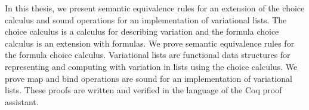 \bigskip
\bigskip
\noindent
In this thesis, we present semantic equivalence rules for an extension of the choice calculus and sound operations for an implementation of variational lists.
The choice calculus is a calculus for describing variation and the formula choice calculus is an extension with formulas.
We prove semantic equivalence rules for the formula choice calculus.
Variational lists are functional data structures for representing and computing with variation in lists using the choice calculus.
We prove map and bind operations are sound for an implementation of variational lists.
These proofs are written and verified in the language of the Coq proof assistant.
